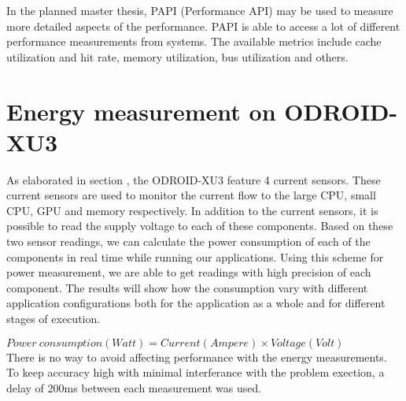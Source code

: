 In the planned master thesis, PAPI (Performance API) may be used to measure more detailed aspects of the performance.
PAPI is able to access a lot of different performance measurements from systems.
The available metrics include cache utilization and hit rate, memory utilization, bus utilization and others.

\section{Energy measurement on ODROID-XU3}
As elaborated in section , the ODROID-XU3 feature 4 current sensors.
These current sensors are used to monitor the current flow to the large CPU, small CPU, GPU and memory respectively.
In addition to the current sensors, it is possible to read the supply voltage to each of these components.
Based on these two sensor readings, we can calculate the power consumption of each of the components in real time while running our applications.
Using this scheme for power measurement, we are able to get readings with high precision of each component.
The results will show how the consumption vary with different application configurations both for the application as a whole and for different stages of execution.

$ Power\ consumption (Watt) = Current (Ampere) \times Voltage (Volt) $
\\
There is no way to avoid affecting performance with the energy measurements.
To keep accuracy high with minimal interferance with the problem exection, a delay of 200ms between each measurement was used.
